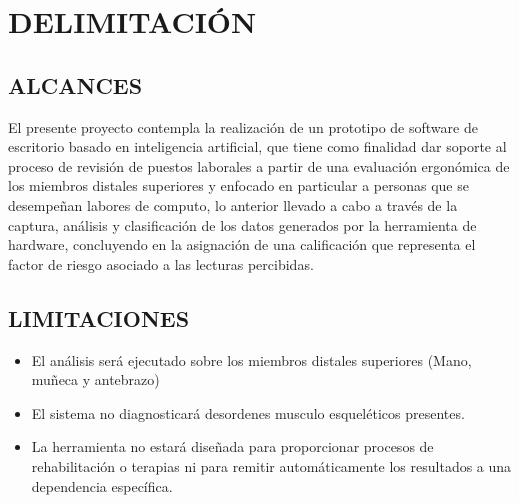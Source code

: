 \chapter{DELIMITACIÓN}
\section{ALCANCES}
El presente proyecto contempla la realización de un prototipo de software de escritorio basado en inteligencia artificial, que tiene como finalidad dar soporte al proceso de revisión de puestos laborales a partir de una evaluación ergonómica de los miembros distales superiores y enfocado en particular a personas que se desempeñan labores de computo, lo anterior llevado a cabo a través de la captura, análisis y clasificación de los datos generados por la herramienta de hardware, concluyendo en la asignación de una calificación que representa el factor de riesgo asociado a las lecturas percibidas.

\section{LIMITACIONES}
\begin{itemize}
\item El análisis será ejecutado sobre los miembros distales superiores (Mano, muñeca y antebrazo)
\item El sistema no diagnosticará desordenes musculo esqueléticos presentes.
\item La herramienta no estará diseñada para proporcionar procesos de rehabilitación o terapias ni para remitir automáticamente los resultados a una dependencia específica.
\end{itemize}